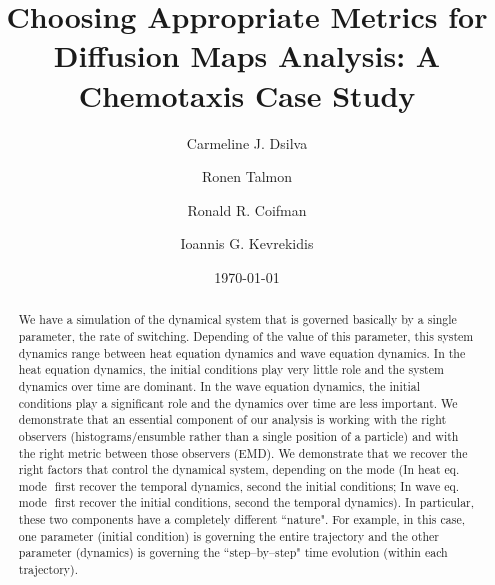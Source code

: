 \documentclass[prl,reprint]{revtex4-1}
\begin{document}
\title{Choosing Appropriate Metrics for Diffusion Maps Analysis: A Chemotaxis Case Study}

\author{Carmeline J. Dsilva}

\author{Ronen Talmon}

\author{Ronald R. Coifman}

\author{Ioannis G. Kevrekidis}

\date{\today}

\begin{abstract}

We have a simulation of the dynamical system that is governed basically by a single parameter,­ the rate of switching.
 Depending of the value of this parameter, this system dynamics range between heat equation dynamics and wave equation dynamics. 
 In the heat equation dynamics, the initial conditions play very little role and the system dynamics over time are dominant. 
 In the wave equation dynamics, the initial conditions play a significant role and the dynamics over time are less important.
We demonstrate that an essential component of our analysis is working with the right observers (histograms/ensumble rather than a single position of a particle) and with the right metric between those observers (EMD).
%
We demonstrate that we recover the right factors that control the dynamical system, depending on the mode (In heat eq. mode ­ first recover the temporal dynamics, second the initial conditions; In wave eq. mode ­ first recover the initial conditions, second the temporal dynamics). In particular, these two components have a completely different ``nature". For example, in this case, one parameter (initial condition) is governing the entire trajectory and the other parameter (dynamics) is governing the ``step­--by­--step" time evolution (within each trajectory).
\end{abstract}

\end{document}
